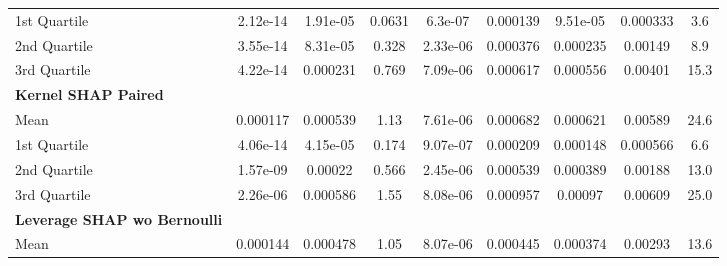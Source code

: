 {\begin{tabular} {lcccccccc}
\hspace{7pt}1st Quartile & \cellcolor{gold!60}2.12e-14 & \cellcolor{gold!60}1.91e-05 & \cellcolor{gold!60}0.0631 & \cellcolor{gold!60}6.3e-07 & \cellcolor{silver!60}0.000139 & \cellcolor{gold!60}9.51e-05 & \cellcolor{silver!60}0.000333 & \cellcolor{silver!60}3.6 \\ 
\hspace{7pt}2nd Quartile & \cellcolor{silver!60}3.55e-14 & \cellcolor{gold!60}8.31e-05 & \cellcolor{gold!60}0.328 & \cellcolor{gold!60}2.33e-06 & \cellcolor{silver!60}0.000376 & \cellcolor{gold!60}0.000235 & \cellcolor{silver!60}0.00149 & \cellcolor{silver!60}8.9 \\ 
\hspace{7pt}3rd Quartile & \cellcolor{silver!60}4.22e-14 & \cellcolor{gold!60}0.000231 & \cellcolor{gold!60}0.769 & \cellcolor{gold!60}7.09e-06 & \cellcolor{gold!60}0.000617 & \cellcolor{gold!60}0.000556 & \cellcolor{silver!60}0.00401 & \cellcolor{silver!60}15.3 \\ 
\addlinespace[1ex] 
\textbf{Kernel SHAP Paired} &  &  &  &  &  &  &  &  \\ 
\hspace{7pt}Mean & \cellcolor{bronze!60}0.000117 & \cellcolor{bronze!60}0.000539 & \cellcolor{bronze!60}1.13 & \cellcolor{silver!60}7.61e-06 & \cellcolor{bronze!60}0.000682 & \cellcolor{bronze!60}0.000621 & 0.00589 & 24.6 \\ 
\hspace{7pt}1st Quartile & \cellcolor{bronze!60}4.06e-14 & \cellcolor{bronze!60}4.15e-05 & \cellcolor{bronze!60}0.174 & \cellcolor{bronze!60}9.07e-07 & \cellcolor{bronze!60}0.000209 & \cellcolor{bronze!60}0.000148 & \cellcolor{bronze!60}0.000566 & 6.6 \\ 
\hspace{7pt}2nd Quartile & 1.57e-09 & \cellcolor{bronze!60}0.00022 & \cellcolor{bronze!60}0.566 & \cellcolor{silver!60}2.45e-06 & \cellcolor{bronze!60}0.000539 & 0.000389 & \cellcolor{bronze!60}0.00188 & 13.0 \\ 
\hspace{7pt}3rd Quartile & \cellcolor{bronze!60}2.26e-06 & \cellcolor{bronze!60}0.000586 & \cellcolor{bronze!60}1.55 & \cellcolor{silver!60}8.08e-06 & \cellcolor{bronze!60}0.000957 & 0.00097 & \cellcolor{bronze!60}0.00609 & \cellcolor{bronze!60}25.0 \\ 
\addlinespace[1ex] 
\textbf{Leverage SHAP wo Bernoulli} &  &  &  &  &  &  &  &  \\ 
\hspace{7pt}Mean & 0.000144 & \cellcolor{silver!60}0.000478 & \cellcolor{silver!60}1.05 & \cellcolor{bronze!60}8.07e-06 & \cellcolor{gold!60}0.000445 & \cellcolor{silver!60}0.000374 & \cellcolor{gold!60}0.00293 & \cellcolor{gold!60}13.6 \\ 

\end{tabular}}
